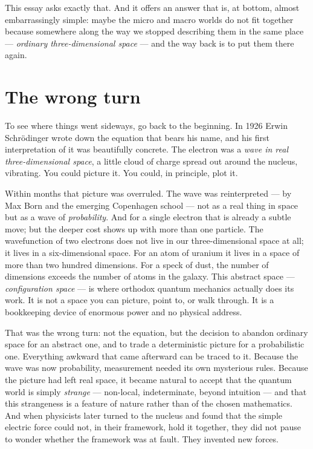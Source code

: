 \documentclass[11pt]{article}
\begin{document}
This essay asks exactly that. And it offers an answer that is, at bottom, almost embarrassingly
simple: maybe the micro and macro worlds do not fit together because somewhere along the way we
stopped describing them in the same place --- \emph{ordinary three-dimensional space} --- and the
way back is to put them there again.

\section*{The wrong turn}

To see where things went sideways, go back to the beginning. In 1926 Erwin Schr\"odinger wrote down
the equation that bears his name, and his first interpretation of it was beautifully concrete. The
electron was a \emph{wave in real three-dimensional space}, a little cloud of charge spread out
around the nucleus, vibrating. You could picture it. You could, in principle, plot it.

Within months that picture was overruled. The wave was reinterpreted --- by Max Born and the
emerging Copenhagen school --- not as a real thing in space but as a wave of \emph{probability}.
And for a single electron that is already a subtle move; but the deeper cost shows up with more
than one particle. The wavefunction of two electrons does not live in our three-dimensional space
at all; it lives in a six-dimensional space. For an atom of uranium it lives in a space of more
than two hundred dimensions. For a speck of dust, the number of dimensions exceeds the number of
atoms in the galaxy. This abstract space --- \emph{configuration space} --- is where orthodox
quantum mechanics actually does its work. It is not a space you can picture, point to, or walk
through. It is a bookkeeping device of enormous power and no physical address.

That was the wrong turn: not the equation, but the decision to abandon ordinary space for an
abstract one, and to trade a deterministic picture for a probabilistic one. Everything awkward
that came afterward can be traced to it. Because the wave was now probability, measurement needed
its own mysterious rules. Because the picture had left real space, it became natural to accept
that the quantum world is simply \emph{strange} --- non-local, indeterminate, beyond intuition ---
and that this strangeness is a feature of nature rather than of the chosen mathematics. And when
physicists later turned to the nucleus and found that the simple electric force could not, in
their framework, hold it together, they did not pause to wonder whether the framework was at fault.
They invented new forces.
\end{document}
